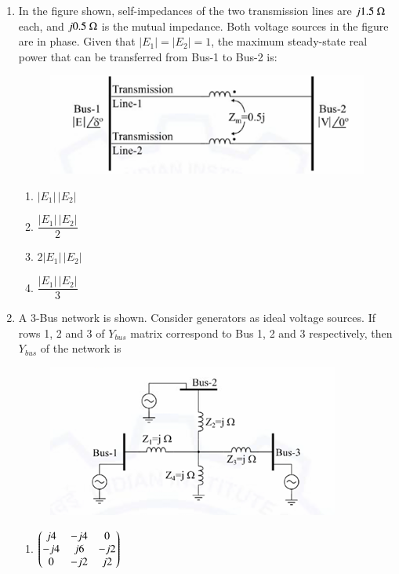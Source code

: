 \documentclass[journal,12pt,onecolumn]{IEEEtran}
\theoremstyle{remark}
\begin{document}
\begin{flushleft}
\begin{enumerate}
\item In the figure shown, self-impedances of the two transmission lines are $j1.5\ \ohm$ each, and $j0.5\ \ohm$ is the mutual impedance.  
Both voltage sources in the figure are in phase. Given that $|E_1|=|E_2|=1$, the maximum steady-state real power that can be transferred from Bus-1 to Bus-2 is:
\begin{figure}[H]
    \centering
    \includegraphics[width=0.5\columnwidth]{figs/44.png}
    \caption{}
    \label{fig:placeholder}
\end{figure}

\begin{multicols}{2}
\begin{enumerate}
    \item $|E_1|\,|E_2|$
    \item $\dfrac{|E_1|\,|E_2|}{2}$
    \item $2|E_1|\,|E_2|$
    \item $\dfrac{|E_1|\,|E_2|}{3}$
\end{enumerate}
\end{multicols}


\item A 3-Bus network is shown. Consider generators as ideal voltage sources. 
If rows 1, 2 and 3 of $Y_{bus}$ matrix correspond to Bus 1, 2 and 3 respectively, 
then $Y_{bus}$ of the network is

\begin{figure}[H]
    \centering
    \includegraphics[width=0.5\columnwidth]{figs/45.png}
    \caption{}
    \label{fig:placeholder}
\end{figure}
\begin{multicols}{2}
\begin{enumerate}
\item $\begin{pmatrix}
j4 & -j4 & 0 \\
-j4 & j6 & -j2 \\
0 & -j2 & j2
\end{pmatrix}$


\end{enumerate}
\end{multicols}
\end{enumerate}
\end{flushleft}
\end{document}
